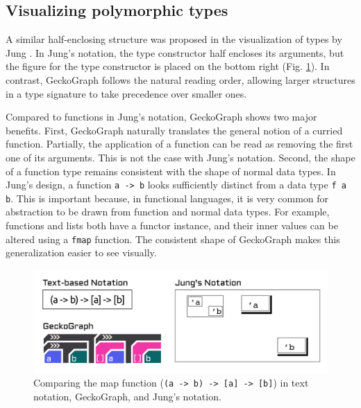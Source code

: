 \subsection{Visualizing polymorphic types}
A similar half-enclosing structure was proposed in the visualization of types by Jung \cite{Jung2000-oc}. In Jung's notation, the type constructor half encloses its arguments, but the figure for the type constructor is placed on the bottom right (Fig. \ref{fig:jung}).  In contrast, GeckoGraph follows the natural reading order, allowing larger structures in a type signature to take precedence over smaller ones. 

Compared to functions in Jung's notation,  GeckoGraph shows two major benefits. First, GeckoGraph naturally translates the general notion of a curried function. Partially, the application of a function can be read as removing the first one of its arguments. This is not the case with Jung's notation. Second, the shape of a function type remains consistent with the shape of normal data types. In Jung's design, a function \texttt{a -> b} looks sufficiently distinct from a data type \texttt{f a b}. This is important because, in functional languages, it is very common for abstraction to be drawn from function and normal data types. For example,  functions and lists both have a functor instance, and their inner values can be altered using a \texttt{fmap} function. The consistent shape of GeckoGraph makes this generalization easier to see visually. 

\begin{figure}[hbt]
  \includegraphics[width=\linewidth]{figures/Jung}
  \caption[Comparing GeckoGraph with Jung's notation]{
        \label{fig:jung}
        Comparing the map function (\texttt{(a -> b) -> [a] -> [b]}) in text notation, GeckoGraph, and Jung's notation.
  }
\end{figure}

